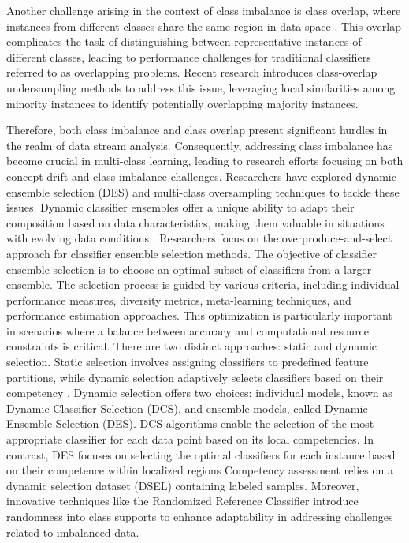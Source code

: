 Another challenge arising in the context of class imbalance is class overlap, where instances from different classes share the same region in data space \cite{bhowan2012evolving} \cite{galar2011review}. This overlap complicates the task of distinguishing between representative instances of different classes, leading to performance challenges for traditional classifiers referred to as overlapping problems. Recent research introduces class-overlap undersampling methods to address this issue, leveraging local similarities among minority instances to identify potentially overlapping majority instances.

Therefore, both class imbalance and class overlap present significant hurdles in the realm of data stream analysis. Consequently, addressing class imbalance has become crucial in multi-class learning, leading to research efforts focusing on both concept drift and class imbalance challenges. Researchers have explored dynamic ensemble selection (DES) and multi-class oversampling techniques to tackle these issues. Dynamic classifier ensembles offer a unique ability to adapt their composition based on data characteristics, making them valuable in situations with evolving data conditions \cite{cruz2018dynamic}. Researchers focus on the overproduce-and-select approach for classifier ensemble selection methods. The objective of classifier ensemble selection is to choose an optimal subset of classifiers from a larger ensemble. The selection process is guided by various criteria, including individual performance measures, diversity metrics, meta-learning techniques, and performance estimation approaches. This optimization is particularly important in scenarios where a balance between accuracy and computational resource constraints is critical. There are two distinct approaches: static and dynamic selection. Static selection involves assigning classifiers to predefined feature partitions, while dynamic selection adaptively selects classifiers based on their competency \cite{kuncheva2000clustering}. Dynamic selection offers two choices: individual models, known as Dynamic Classifier Selection (DCS), and ensemble models, called Dynamic Ensemble Selection (DES). DCS algorithms enable the selection of the most appropriate classifier for each data point based on its local competencies. In contrast, DES focuses on selecting the optimal classifiers for each instance based on their competence within localized regions \cite{woloszynski2011probabilistic} \cite{lysiak2014optimal} \cite{cruz2017meta} Competency assessment relies on a dynamic selection dataset (DSEL) containing labeled samples. Moreover, innovative techniques like the Randomized Reference Classifier introduce randomness into class supports to enhance adaptability in addressing challenges related to imbalanced data.

